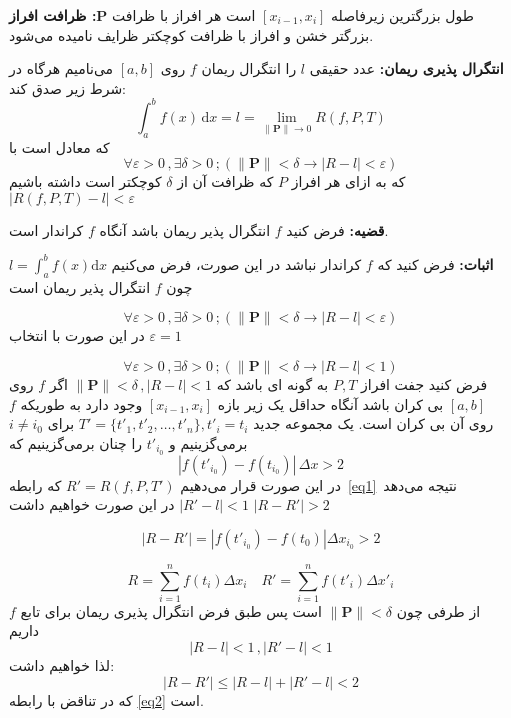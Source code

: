 \documentclass[12pt]{report}
\begin{document}
\textbf{ظرافت افراز :P}
طول بزرگترین زیرفاصله 
$[x_{i - 1}, x_i]$
است هر افراز با ظرافت بزرگتر خشن و افراز با ظرافت کوچکتر ظرایف نامیده می‌شود.


\textbf{انتگرال پذیری ریمان:}
عدد حقیقی $l$ را انتگرال ریمان $f$ روی $[a, b]$ می‌نامیم هرگاه در شرط زیر صدق کند:
\[
\int_{a}^{b} f(x)\, \mathrm{d}x = l = \lim_{ \lVert \mathbf{P} \rVert \to 0} R(f, P, T)
\]
که معادل است با 
\[
\forall \varepsilon > 0 \,, \exists \delta > 0\, ; (\lVert \mathbf{P} \rVert < \delta \rightarrow |R - l| < \varepsilon)
\]
که به ازای هر افراز $P$ که ظرافت آن از $\delta$ کوچکتر است داشته باشیم\quad 
$|R(f, P, T)-l|< \varepsilon$

\textbf{قضیه:}
فرض کنید $f$ انتگرال پذیر ریمان باشد آنگاه $f$ کراندار است.

\textbf{اثبات:}
فرض کنید که $f$ کراندار نباشد در این صورت، فرض می‌کنیم 
$l = \int_{a}^{b} f(x) \mathrm{d}x$
چون $f$ انتگرال پذیر ریمان است
  
\[
\forall \varepsilon > 0 \,, \exists \delta > 0\, ; (\lVert \mathbf{P} \rVert < \delta \rightarrow |R - l| < \varepsilon)
\]
در این صورت با انتخاب
$\varepsilon = 1$





\begin{equation}\label{eq1}
	\forall \varepsilon > 0 \,, \exists \delta > 0\, ; (\lVert \mathbf{P} \rVert < \delta \rightarrow |R - l| < 1)
\end{equation}
فرض کنید جفت افراز 
$P, T$
به گونه ای باشد که 
$\lVert \mathbf{P} \rVert < \delta \, , |R - l| < 1$
اگر $f$ روی $[a, b]$ بی کران  باشد آنگاه حداقل یک زیر بازه 
$[x_{i - 1}, x_i]$
وجود دارد به طوریکه $f$ روی آن بی کران است. یک مجموعه جدید 
$T' = \{t'_1, t'_2, \dots, t'_n\} , t'_i = t_i$
 برای 
 $i \neq i_0$
 برمی‌گزینیم و
$t'_{i_0}$
را چنان برمی‌گزینیم که
\[
|f(t'_{i_0}) - f(t
_{i_0})|\,\Delta x > 2
\]
در این صورت قرار می‌دهیم 
$R'= R(f, P, T')$
که رابطه 
\,\eqref{eq1}\,
نتیجه می‌دهد
$|R' - l| < 1$
در این صورت خواهیم داشت 
$|R - R'| > 2$

\begin{equation}\label{eq2}
	|R - R'| = |f(t'_{i_0}) - f(t_0)|\Delta x_{i_0} > 2 
\end{equation}

\[
R = \sum_{i = 1}^n f(t_i) \Delta x_i \quad R' = \sum_{i = 1}^n f(t'_i) \Delta x'_i
\]
از طرفی چون 
$\lVert \mathbf{P} \rVert < \delta$	
است پس طبق فرض انتگرال پذیری ریمان برای تابع $f$ داریم 
\[
|R - l|<1 \,, |R' - l| < 1
\]
لذا خواهیم داشت:
\[
|R - R'| \leq |R-l|+|R'-l| < 2
\]
که در تناقض با رابطه
\eqref{eq2}
است.
\\~\\
\end{document}
